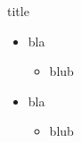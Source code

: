 \documentclass{beamer}
\begin{document}
\begin{frame}
    \begin{block}{title}
        \begin{itemize}
            \item bla
            \begin{itemize}
                \item blub
            \end{itemize}
        \end{itemize}
    \end{block}

    \begin{itemize}
        \item bla
        \begin{itemize}
            \item blub
        \end{itemize}       
    \end{itemize}
\end{frame} 
\end{document}
